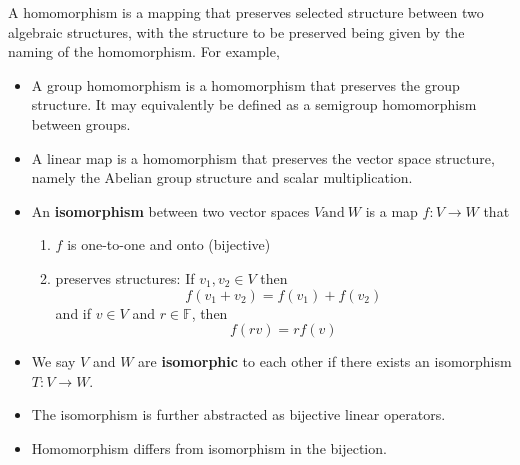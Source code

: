 \begin{refsection}
\begin{remark}
	A homomorphism is a mapping that preserves selected structure between two algebraic structures, with the structure to be preserved being given by the naming of the homomorphism.\cite{wiki:homomorphism}
	For example,
	\begin{itemize}
		\item A group homomorphism is a homomorphism that preserves the group structure. It may equivalently be defined as a semigroup homomorphism between groups.
		\item A linear map is a homomorphism that preserves the vector space structure, namely the Abelian group structure and scalar multiplication.
	\end{itemize}	
\end{remark}


\begin{definition}[isomorphism]\hfill
\begin{itemize}
	\item 	An \textbf{isomorphism} between two vector spaces $V \text{and} ~W$ is a map $f:V \rightarrow W$ that
	\begin{enumerate}
		\item $f$ is one-to-one and onto (bijective)
		\item preserves structures: If $v_1,v_2 \in V$ then $$f(v_1+v_2) = f(v_1) + f(v_2)$$ and if $v \in V$ and $r \in \mathbb{F}$, then $$f(rv)=rf(v)$$
	\end{enumerate}
\item We say $V$ and $W$ are \textbf{isomorphic} to each other if there exists an isomorphism $T:V\to W$.
\end{itemize}	 
\end{definition}

\begin{remark}\hfill
	\begin{itemize}
		\item The isomorphism is further abstracted as bijective linear operators.
		\item Homomorphism differs from isomorphism in the bijection. 
	\end{itemize}
\end{remark}


\end{refsection}
